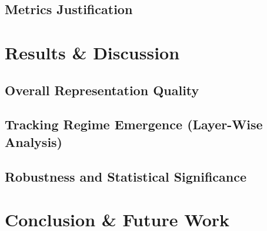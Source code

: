 \documentclass[twocolumn, 10pt]{article}
\begin{document}
\subsection{Metrics Justification}

\section{Results \& Discussion}
\label{sec:results}

\subsection{Overall Representation Quality}

\subsection{Tracking Regime Emergence (Layer-Wise Analysis)}

\subsection{Robustness and Statistical Significance}

\section{Conclusion \& Future Work}
\end{document}
